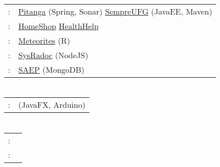 \documentclass[a4paper,10pt]{article} %
\begin{document}
\section{\collegeProjectsSection}

\begin{tabular}{rp{11cm}}
	\devOpsResponsible: &
	\href{https://github.com/SaladaDeFrutas/Pitanga}{Pitanga}
	(Spring, Sonar) 
	\andWord \href{https://github.com/ES-INF-UFG-2016-2/Sempre-UFG}{SempreUFG}
	(JavaEE, Maven) \\
	\androidConcepts: &
	\href{https://github.com/Yuri-M-Dias/HomeShop}{HomeShop} \andWord
	\href{https://github.com/Yuri-M-Dias/HealthHelp}{HealthHelp} \\
	\dataVisualization: &
	\href{https://github.com/Yuri-M-Dias/meteorites}{Meteorites} (R) \\
	\verificationAndValidationResponsible: &
	\href{https://bitbucket.org/SysRadocTeam/sysradoc}{SysRadoc}
	(NodeJS) \\
	\apiImplementation: &
	\href{https://github.com/Yuri-M-Dias/SAEP}{SAEP} (MongoDB) \\

\end{tabular}


\section{\researchProjectsSection}

\begin{tabular}{rp{11cm}}

	\interactionAndIHC: &
	\href{https://siimi.medialab.ufg.br/up/777/o/49_cubos_interativos.pdf}
		{\CThreeTitle} (JavaFX, Arduino)\\

\end{tabular}


\section{\languagesSection}

\begin{tabular}{rp{11cm}}

	\textsc{\english:} & \englishDescription \\

	\textsc{\french:} & \frenchDescription \\

\end{tabular}
\end{document}
